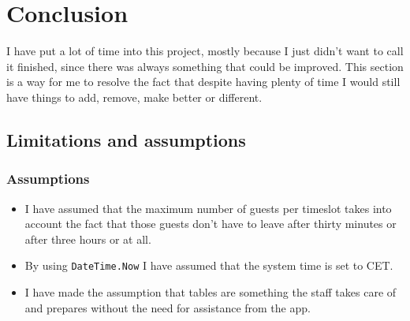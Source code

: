\documentclass[12pt, a4paper]{article}
\begin{document}
\section{Conclusion}
I have put a lot of time into this project, mostly because I just didn't want to call it finished, since there was always something that could be improved. This section is a way for me to resolve the fact that despite having plenty of time I would still have things to add, remove, make better or different.
\subsection{Limitations and assumptions}
\subsubsection{Assumptions}
\begin{itemize}
        \item I have assumed that the maximum number of guests per timeslot takes into account the fact that those guests don't have to leave after thirty minutes or after three hours or at all.
        \item By using \texttt{DateTime.Now} I have assumed that the system time is set to CET.
        \item I have made the assumption that tables are something the staff takes care of and prepares without the need for assistance from the app.
\end{itemize}
\end{document}
